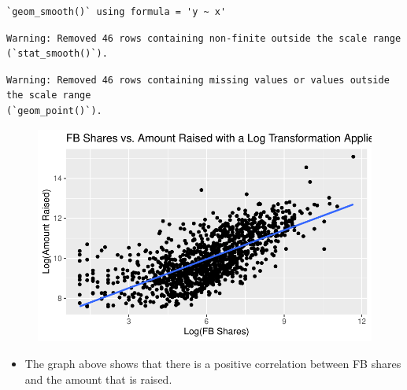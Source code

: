 \documentclass[
  letterpaper,
  DIV=11,
  numbers=noendperiod]{scrartcl}
\providecommand{\tightlist}{%
  \setlength{\itemsep}{0pt}\setlength{\parskip}{0pt}}\usepackage{longtable,booktabs,array}
\begin{document}
\begin{verbatim}
`geom_smooth()` using formula = 'y ~ x'
\end{verbatim}

\begin{verbatim}
Warning: Removed 46 rows containing non-finite outside the scale range
(`stat_smooth()`).
\end{verbatim}

\begin{verbatim}
Warning: Removed 46 rows containing missing values or values outside the scale range
(`geom_point()`).
\end{verbatim}

\begin{figure}[H]

{\centering \includegraphics{gfm_data_analysis_files/figure-pdf/social-media-analysis-3-1.pdf}

}

\end{figure}

\begin{itemize}
\tightlist
\item
  The graph above shows that there is a positive correlation between FB
  shares and the amount that is raised.
\end{itemize}
\end{document}
